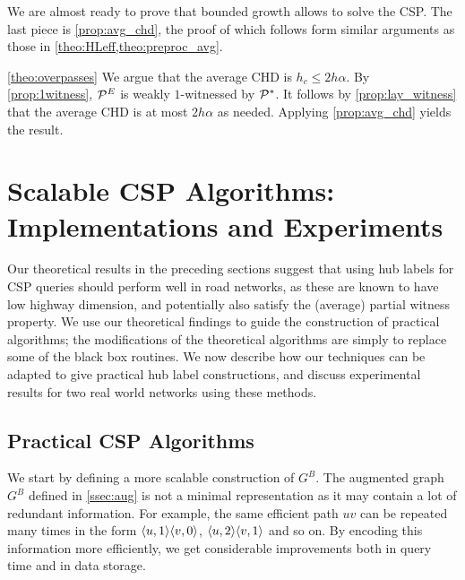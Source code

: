 \documentclass[opre,nonblindrev]{informs3} %
\begin{document}
We are almost ready to prove that bounded growth allows to solve the CSP.
The last piece is \cref{prop:avg_chd}, the proof of which follows form similar arguments as those in \cref{theo:HLeff,theo:preproc_avg}.


\begin{proofof}{\cref{theo:overpasses}}
We argue that the average CHD is $h_c\leq 2h\alpha $.
By \cref{prop:1witness}, $\mathcal{P}^E$ is weakly $1$-witnessed by $\mathcal{P}^*$.
It follows by \cref{prop:lay_witness} that the average CHD is at most $2h\alpha$ as needed.
Applying \cref{prop:avg_chd} yields the result.
\end{proofof}

\section{Scalable CSP Algorithms: Implementations and Experiments}
\label{sec:numeric}
Our theoretical results in the preceding sections suggest that using hub labels for CSP queries should perform well in road networks, as these are known to have low highway dimension, and potentially also satisfy the (average) partial witness property. 
We use our theoretical findings to guide the construction of practical algorithms; the modifications of the theoretical algorithms are simply to replace some of the black box routines.
We now describe how our techniques can be adapted to give practical hub label constructions, and discuss experimental results for two real world networks using these methods. 
\subsection{Practical CSP Algorithms} 
\label{ssec:practical}

We start by defining a more scalable construction of $G^B$.
The augmented graph $G^B$ defined in \cref{ssec:aug} is not a minimal representation as it may contain a lot of redundant information.
For example, the same efficient path $uv$ can be repeated many times in the form $\langle u,1\rangle\langle v,0\rangle$, $\langle u,2\rangle\langle v,1\rangle$ and so on.
By encoding this information more efficiently, we get considerable improvements both in query time and in data storage.
\end{document}
